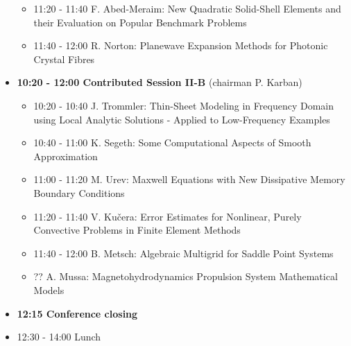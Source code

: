 \documentclass[10pt, A4]{article}%
\begin{document}
\begin{itemize}
\begin{itemize}
    \item 11:20 - 11:40 F. Abed-Meraim: New Quadratic Solid-Shell Elements and their Evaluation on Popular Benchmark Problems
    \item 11:40 - 12:00 R. Norton: Planewave Expansion Methods for Photonic Crystal Fibres
  \end{itemize}
    \item {\bf 10:20 - 12:00 Contributed Session II-B} (chairman P. Karban) 
  \begin{itemize}
    \item 10:20 - 10:40 J. Trommler: Thin-Sheet Modeling in Frequency Domain using Local Analytic Solutions - Applied to Low-Frequency Examples
    \item 10:40 - 11:00 K. Segeth: Some Computational Aspects of Smooth Approximation
    \item 11:00 - 11:20 M. Urev: Maxwell Equations with New Dissipative Memory Boundary Conditions
    \item 11:20 - 11:40 V. Ku\v{c}era: Error Estimates for Nonlinear, Purely Convective Problems in Finite Element Methods
    \item 11:40 - 12:00 B. Metsch: Algebraic Multigrid for Saddle Point Systems 
    \item ?? A. Mussa: Magnetohydrodynamics Propulsion System Mathematical Models
  \end{itemize}
  \item {\bf 12:15 Conference closing}
  \item 12:30 - 14:00 Lunch
\end{itemize}
\end{document}
